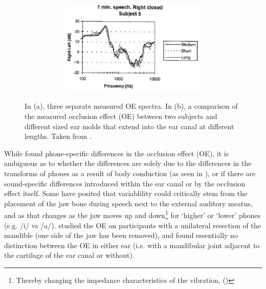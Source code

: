 \documentclass[dissertation,copyright]{uathesis}
\begin{document}
\begin{figure}
\begin{subfigure}{0.5\textwidth}
\begin{subfigure}{1\textwidth}
    \includegraphics[width=1\textwidth]{figure/Hansen_OE-plot_b.png}
  \end{subfigure}
  \caption{ }
  \label{fig:hansenAverageOEb}
\end{subfigure}
\caption{In (a), three separate measured OE spectra. In (b), a comparison of the measured occlusion effect (OE) between two subjects and different sized ear molds that extend into the ear canal at different lengths. Taken from \cite{hansen:97b}.}
\label{fig:hansenAverageOE}
\end{figure}

While \cite{hansen:97b} found phone-specific differences in the occlusion effect (OE), it is ambiguous as to whether the differences are solely due to the differences in the transforms of phones as a result of body conduction (as seen in \cite{reinfeldt:10}), or if there are sound-specific differences introduced within the ear canal or by the occlusion effect itself.  Some have posited that variablility could critically stem from the placement of the jaw bone during speech next to the external auditory meatus, and as that changes as the jaw moves up and down\footnote{Thereby changing the impedance characteristics of the vibration, (\cite{bekesy:60})} for `higher' or `lower' phones (e.g. /i/ vs /a/).  \cite{allen:60} studied the OE on participants with a unilateral resection of the mandible (one side of the jaw has been removed), and found essentially no distinction between the OE in either ear (i.e. with a mandibular joint adjacent to the cartilage of the ear canal or without).
\end{document}
